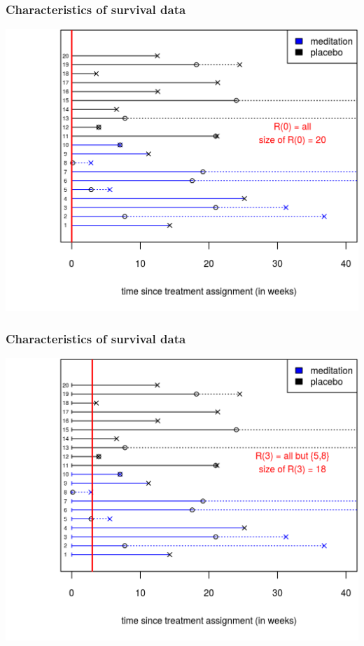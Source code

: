 \documentclass[12pt, 
hyperref={colorlinks=true, linkcolor=blue, urlcolor=cyan},dvipsnames]{beamer}
\begin{document}
\begin{frame}
\frametitle{Characteristics of survival data}
\begin{center}
\includegraphics[height=0.8\textheight]{figs/risk_set_movie_0.png}
\end{center}
\end{frame}

\begin{frame}
\frametitle{Characteristics of survival data}
\begin{center}
\includegraphics[height=0.8\textheight]{figs/risk_set_movie_1.png}
\end{center}
\end{frame}
\end{document}
